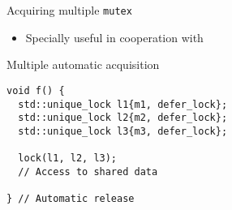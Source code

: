 \begin{frame}[t,fragile]{Acquiring multiple \texttt{mutex}}
\begin{itemize}
  \item Specially useful in cooperation with 
\end{itemize}

\begin{block}{Multiple automatic acquisition}
\begin{lstlisting}
void f() {
  std::unique_lock l1{m1, defer_lock}; 
  std::unique_lock l2{m2, defer_lock}; 
  std::unique_lock l3{m3, defer_lock};
  
  lock(l1, l2, l3);
  // Access to shared data

} // Automatic release
\end{lstlisting}
\end{block}
\end{frame}

